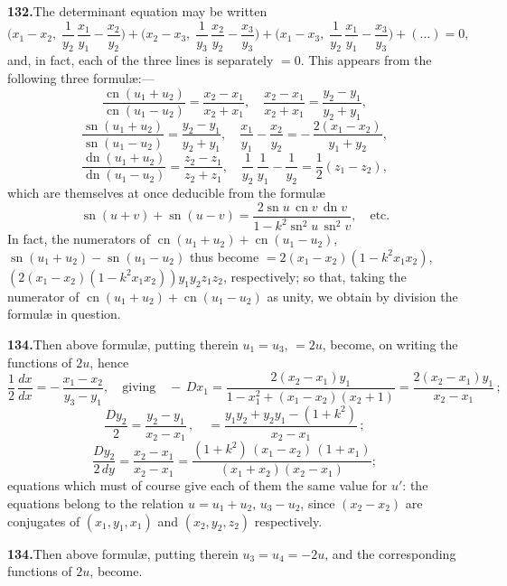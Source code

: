 \documentclass[11pt,a4paper]{article}
\DeclareMathOperator{\sn}{sn}
\DeclareMathOperator{\cn}{cn}
\DeclareMathOperator{\dn}{dn}
\begin{document}
\medskip\noindent\textbf{132.}\quad The determinant equation may be written
\[
\bigl(x_1 - x_2,\;\frac{1}{y_2}\,\frac{x_1}{y_1} - \frac{x_2}{y_2}\bigr) + \bigl(x_2 - x_3,\;\frac{1}{y_3}\,\frac{x_2}{y_2} - \frac{x_3}{y_3}\bigr) + \bigl(x_1 - x_3,\;\frac{1}{y_2}\,\frac{x_1}{y_1} - \frac{x_3}{y_3}\bigr) + (\ldots) = 0,
\]
and, in fact, each of the three lines is separately $= 0$. This appears from the following three formul\ae{}:---
\[
\frac{\cn(u_1 + u_2)}{\cn(u_1 - u_2)} = \frac{x_2 - x_1}{x_2 + x_1},\quad\frac{x_2 - x_1}{x_2 + x_1} = \frac{y_2 - y_1}{y_2 + y_1},
\]
\[
\frac{\sn(u_1 + u_2)}{\sn(u_1 - u_2)} = \frac{y_2 - y_1}{y_2 + y_1},\quad \frac{x_1}{y_1} - \frac{x_2}{y_2} = -\,\frac{2(x_1 - x_2)}{y_1 + y_2},
\]
\[
\frac{\dn(u_1 + u_2)}{\dn(u_1 - u_2)} = \frac{z_2 - z_1}{z_2 + z_1},\quad \frac{1}{y_2}\,\frac{1}{y_1} - \frac{1}{y_2} = \frac{1}{2}(z_1 - z_2),
\]
which are themselves at once deducible from the formul\ae{}
\[
\sn(u + v) + \sn(u - v) = \frac{2\sn u\,\cn v\,\dn v}{1 - k^2\sn^2 u\,\sn^2 v},\quad\text{etc.}
\]
In fact, the numerators of $\cn(u_1 + u_2) + \cn(u_1 - u_2)$, $\sn(u_1 + u_2) - \sn(u_1 - u_2)$ thus become $= 2(x_1 - x_2)(1 - k^2 x_1 x_2)$, $(2(x_1 - x_2)(1 - k^2 x_1 x_2)) y_1 y_2 z_1 z_2$, respectively; so that, taking the numerator of $\cn(u_1 + u_2) + \cn(u_1 - u_2)$ as unity, we obtain by division the formul\ae{} in question.

\medskip\noindent\textbf{134.}\quad Then above formul\ae{}, putting therein $u_1 = u_3$, $= 2u$, become, on writing the functions of $2u$, hence
\[
\frac{1}{2}\,\frac{dx}{dx} = -\,\frac{x_1 - x_2}{y_3 - y_1},\quad\text{giving}\quad -\,Dx_1 = \frac{2(x_2 - x_1)y_1}{1 - x_1^2 + (x_1 - x_2)(x_2 + 1)} = \frac{2(x_2 - x_1)y_1}{x_2 - x_1}\,;
\]
\[
\frac{Dy_2}{2} = \frac{y_2 - y_1}{x_2 - x_1}\,,\quad = \frac{y_1 y_2 + y_2 y_1 - (1 + k^2)}{x_2 - x_1}\,;
\]
\[
\frac{D y_2}{2 \, dy} = \frac{x_2 - x_1}{x_2 - x_1} = \frac{(1 + k^2)\,(x_1 - x_2)\,(1 + x_1)}{(x_1 + x_2)(x_2 - x_1)};
\]
equations which must of course give each of them the same value for $u'$: the equations belong to the relation $u = u_1 + u_2$, $u_3 - u_2$, since $(x_2 - x_2)$ are conjugates of $(x_1, y_1, x_1)$ and $(x_2, y_2, z_2)$ respectively.

\medskip\noindent\textbf{134.}\quad Then above formul\ae{}, putting therein $u_3 = u_4 = -2u$, and the corresponding functions of $2u$, become.
\end{document}
